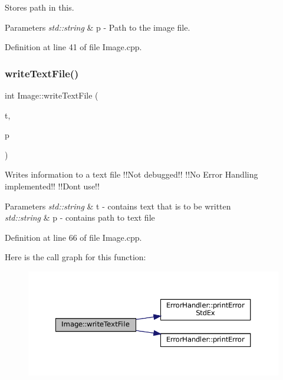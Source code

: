 Stores path in this. 


\begin{DoxyParams}{Parameters}
{\em std\+::string} & p -\/ Path to the image file. \\
\hline
\end{DoxyParams}


Definition at line 41 of file Image.\+cpp.

\mbox{\label{classImage_a2dc30c9d6280b8c0edd2f4f0ab474a5c}} 
\subsubsection{\texorpdfstring{writeTextFile()}{writeTextFile()}}
{\footnotesize\ttfamily int Image\+::write\+Text\+File (\begin{DoxyParamCaption}\item[{std\+::string}]{t,  }\item[{std\+::string}]{p }\end{DoxyParamCaption})}



Writes information to a text file !!\+Not debugged!! !!\+No Error Handling implemented!! !!\+Dont use!! 


\begin{DoxyParams}{Parameters}
{\em std\+::string} & t -\/ contains text that is to be written \\
\hline
{\em std\+::string} & p -\/ contains path to text file \\
\hline
\end{DoxyParams}


Definition at line 66 of file Image.\+cpp.

Here is the call graph for this function\+:
\nopagebreak
\begin{figure}[H]
\begin{center}
\leavevmode
\includegraphics[width=350pt]{classImage_a2dc30c9d6280b8c0edd2f4f0ab474a5c_cgraph}
\end{center}
\end{figure}


